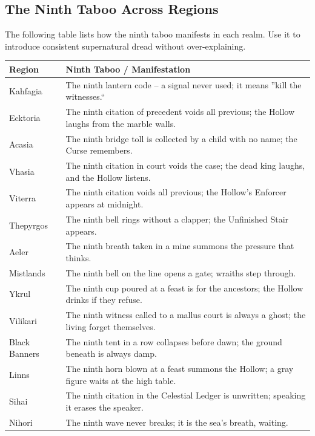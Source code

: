 \documentclass[11pt,letterpaper,twoside]{book}
\begin{document}
\subsection*{The Ninth Taboo Across Regions}

The following table lists how the ninth taboo manifests in each realm. Use it to introduce consistent supernatural dread without over-explaining.

\begin{longtable}{|p{}|p{}|}
\hline
\textbf{Region} & \textbf{Ninth Taboo / Manifestation} \\
\hline
Kahfagia & The ninth lantern code -- a signal never used; it means ''kill the witnesses.`` \\
\hline
Ecktoria & The ninth citation of precedent voids all previous; the Hollow laughs from the marble walls. \\
\hline
Acasia & The ninth bridge toll is collected by a child with no name; the Curse remembers. \\
\hline
Vhasia & The ninth citation in court voids the case; the dead king laughs, and the Hollow listens. \\
\hline
Viterra & The ninth citation voids all previous; the Hollow's Enforcer appears at midnight. \\
\hline
Thepyrgos & The ninth bell rings without a clapper; the Unfinished Stair appears. \\
\hline
Aeler & The ninth breath taken in a mine summons the pressure that thinks. \\
\hline
Mistlands & The ninth bell on the line opens a gate; wraiths step through. \\
\hline
Ykrul & The ninth cup poured at a feast is for the ancestors; the Hollow drinks if they refuse. \\
\hline
Vilikari & The ninth witness called to a mallus court is always a ghost; the living forget themselves. \\
\hline
Black Banners & The ninth tent in a row collapses before dawn; the ground beneath is always damp. \\
\hline
Linns & The ninth horn blown at a feast summons the Hollow; a gray figure waits at the high table. \\
\hline
Sihai & The ninth citation in the Celestial Ledger is unwritten; speaking it erases the speaker. \\
\hline
Nihori & The ninth wave never breaks; it is the sea's breath, waiting. \\

\end{longtable}
\end{document}
